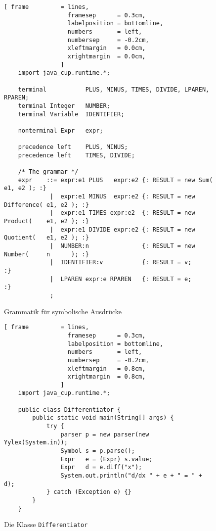 \begin{figure}[!ht]
\centering
\begin{Verbatim}[ frame         = lines, 
                  framesep      = 0.3cm, 
                  labelposition = bottomline,
                  numbers       = left,
                  numbersep     = -0.2cm,
                  xleftmargin   = 0.0cm,
                  xrightmargin  = 0.0cm,
                ]
    import java_cup.runtime.*;
    
    terminal           PLUS, MINUS, TIMES, DIVIDE, LPAREN, RPAREN;
    terminal Integer   NUMBER;
    terminal Variable  IDENTIFIER;
    
    nonterminal Expr   expr;
    
    precedence left    PLUS, MINUS;
    precedence left    TIMES, DIVIDE;
    
    /* The grammar */
    expr    ::= expr:e1 PLUS   expr:e2 {: RESULT = new Sum(        e1, e2 ); :} 
             |  expr:e1 MINUS  expr:e2 {: RESULT = new Difference( e1, e2 ); :}
             |  expr:e1 TIMES expr:e2  {: RESULT = new Product(    e1, e2 ); :}
             |  expr:e1 DIVIDE expr:e2 {: RESULT = new Quotient(   e1, e2 ); :}
             |  NUMBER:n               {: RESULT = new Number(     n      ); :} 
             |  IDENTIFIER:v           {: RESULT = v;                        :} 
             |  LPAREN expr:e RPAREN   {: RESULT = e;                        :}
             ;
\end{Verbatim}
\vspace*{-0.3cm}
\caption{Grammatik f\"ur symbolische Ausdr\"ucke}
\label{fig:differentiator.cup}
\end{figure}


\begin{figure}[!ht]
\centering
\begin{Verbatim}[ frame         = lines, 
                  framesep      = 0.3cm, 
                  labelposition = bottomline,
                  numbers       = left,
                  numbersep     = -0.2cm,
                  xleftmargin   = 0.8cm,
                  xrightmargin  = 0.8cm,
                ]
    import java_cup.runtime.*;
    
    public class Differentiator {
        public static void main(String[] args) {
            try { 
                parser p = new parser(new Yylex(System.in)); 
                Symbol s = p.parse(); 
                Expr   e = (Expr) s.value;
                Expr   d = e.diff("x");
                System.out.println("d/dx " + e + " = " + d);
            } catch (Exception e) {}
        }
    }
\end{Verbatim}
\vspace*{-0.3cm}
\caption{Die Klasse \texttt{Differentiator}}
\label{fig:Differentiator.java}
\end{figure}

